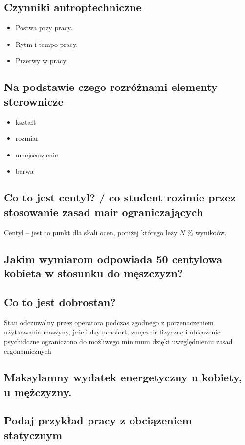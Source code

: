 \documentclass[11pt]{article}
\begin{document}
\subsection{Czynniki antroptechniczne}
\label{sec:org651d93a}
\begin{itemize}
\item Postwa przy pracy.
\item Rytm i tempo pracy.
\item Przerwy w pracy.
\end{itemize}
\subsection{Na podstawie czego rozróżnami elementy sterownicze}
\label{sec:orge82784f}
\begin{itemize}
\item kształt
\item rozmiar
\item umejscowienie
\item barwa
\end{itemize}
\subsection{Co to jest centyl? / co student rozimie przez stosowanie zasad mair ograniczających}
\label{sec:orga140e42}
Centyl -- jest to punkt dla skali ocen, poniżej którego leży \(N\) \% wynikoów.
\subsection{Jakim wymiarom odpowiada 50 centylowa kobieta w stosunku do męszczyzn?}
\label{sec:org3e3a87b}
\subsection{Co to jest dobrostan?}
\label{sec:org3bc5635}
Stan odczuwalny przez operatora podczas zgodnego z porzenaczeniem użytkowania maszyny, jeżeli dsykomofort, zmęcznie fizyczne i obicazenie psychidczne ograniczono do możliwego minimum dzięki uwzględnieniu zasad ergonomicznych
\subsection{Maksylamny wydatek energetyczny u kobiety, u mężczyzny.}
\label{sec:orgc705111}
\subsection{Podaj przykład pracy z obciązeniem statycznym}
\label{sec:org6478ea1}
\end{document}
